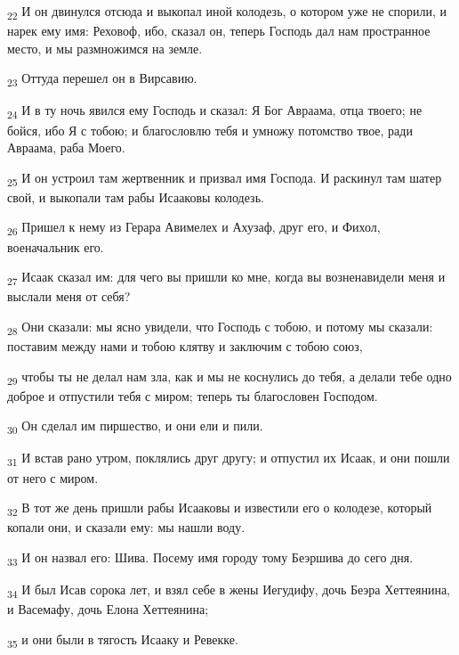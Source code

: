 \begin{tcolorbox}
\textsubscript{22} И он двинулся отсюда и выкопал иной колодезь, о котором уже не спорили, и нарек ему имя: Реховоф, ибо, сказал он, теперь Господь дал нам пространное место, и мы размножимся на земле.
\end{tcolorbox}
\begin{tcolorbox}
\textsubscript{23} Оттуда перешел он в Вирсавию.
\end{tcolorbox}
\begin{tcolorbox}
\textsubscript{24} И в ту ночь явился ему Господь и сказал: Я Бог Авраама, отца твоего; не бойся, ибо Я с тобою; и благословлю тебя и умножу потомство твое, ради Авраама, раба Моего.
\end{tcolorbox}
\begin{tcolorbox}
\textsubscript{25} И он устроил там жертвенник и призвал имя Господа. И раскинул там шатер свой, и выкопали там рабы Исааковы колодезь.
\end{tcolorbox}
\begin{tcolorbox}
\textsubscript{26} Пришел к нему из Герара Авимелех и Ахузаф, друг его, и Фихол, военачальник его.
\end{tcolorbox}
\begin{tcolorbox}
\textsubscript{27} Исаак сказал им: для чего вы пришли ко мне, когда вы возненавидели меня и выслали меня от себя?
\end{tcolorbox}
\begin{tcolorbox}
\textsubscript{28} Они сказали: мы ясно увидели, что Господь с тобою, и потому мы сказали: поставим между нами и тобою клятву и заключим с тобою союз,
\end{tcolorbox}
\begin{tcolorbox}
\textsubscript{29} чтобы ты не делал нам зла, как и мы не коснулись до тебя, а делали тебе одно доброе и отпустили тебя с миром; теперь ты благословен Господом.
\end{tcolorbox}
\begin{tcolorbox}
\textsubscript{30} Он сделал им пиршество, и они ели и пили.
\end{tcolorbox}
\begin{tcolorbox}
\textsubscript{31} И встав рано утром, поклялись друг другу; и отпустил их Исаак, и они пошли от него с миром.
\end{tcolorbox}
\begin{tcolorbox}
\textsubscript{32} В тот же день пришли рабы Исааковы и известили его о колодезе, который копали они, и сказали ему: мы нашли воду.
\end{tcolorbox}
\begin{tcolorbox}
\textsubscript{33} И он назвал его: Шива. Посему имя городу тому Беэршива до сего дня.
\end{tcolorbox}
\begin{tcolorbox}
\textsubscript{34} И был Исав сорока лет, и взял себе в жены Иегудифу, дочь Беэра Хеттеянина, и Васемафу, дочь Елона Хеттеянина;
\end{tcolorbox}
\begin{tcolorbox}
\textsubscript{35} и они были в тягость Исааку и Ревекке.
\end{tcolorbox}
